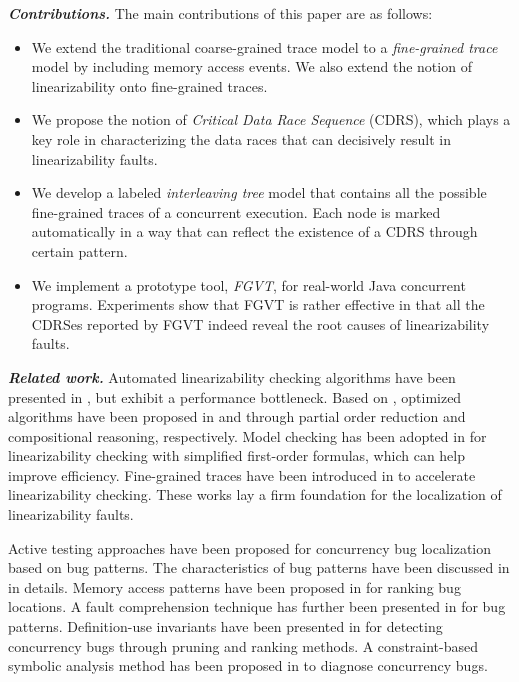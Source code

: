 \documentclass[runningheads]{llncs}
\begin{document}
\noindent\textbf{\textit{Contributions.}}
The main contributions of this paper are as follows:
\begin{itemize}
  \item We extend the traditional coarse-grained trace model to a \textit{fine-grained trace} model by including memory access events. We also extend the notion of linearizability onto fine-grained traces.
  \item We propose the notion of \textit{Critical Data Race Sequence} (CDRS), which plays a key role in characterizing the data races that can decisively result in linearizability faults.
  \item We develop a labeled \textit{interleaving tree} model that contains all the possible fine-grained traces of a concurrent execution. Each node is marked automatically in a way that can reflect the existence of a CDRS through certain pattern.
  \item We implement a prototype tool, \textit{FGVT}, for real-world Java concurrent programs. Experiments show that FGVT is rather effective in that all the CDRSes reported by FGVT indeed reveal the root causes of linearizability faults.
\end{itemize}

\noindent\textbf{\textit{Related work.}} Automated linearizability checking algorithms have been presented in \cite{DBLP:conf/pldi/BurckhardtDMT10,DBLP:journals/jpdc/WingG93}, but exhibit a performance bottleneck. Based on \cite{DBLP:journals/jpdc/WingG93}, optimized algorithms have been proposed in \cite{DBLP:journals/concurrency/Lowe17} and \cite{DBLP:conf/forte/HornK15a} through partial order reduction and compositional reasoning, respectively. Model checking has been adopted in \cite{DBLP:conf/popl/BouajjaniEEH15,DBLP:conf/pldi/EmmiEH15} for linearizability checking with simplified first-order formulas, which can help improve efficiency. Fine-grained traces have been introduced in \cite{DBLP:conf/sac/LongZ16} to accelerate linearizability checking. These works lay a firm foundation for the localization of linearizability faults.

Active testing approaches have been proposed for concurrency bug localization based on bug patterns. %
The characteristics of bug patterns have been discussed in \cite{DBLP:conf/asplos/LuPSZ08,DBLP:conf/ipps/FarchiNU03} in details. Memory access patterns have been proposed in \cite{DBLP:conf/icse/ParkVH10,DBLP:conf/icst/ParkVH12,DBLP:conf/icsm/LiuQWM14} for ranking bug locations. A fault comprehension technique has further been presented in \cite{DBLP:conf/icse/Park04} for bug patterns. Definition-use invariants have been presented in \cite{DBLP:conf/oopsla/ShiPYLZCZ10} for detecting concurrency bugs through pruning and ranking methods. A constraint-based symbolic analysis method has been proposed in \cite{DBLP:conf/issta/KhoshnoodKW15} to diagnose concurrency bugs.
\end{document}
